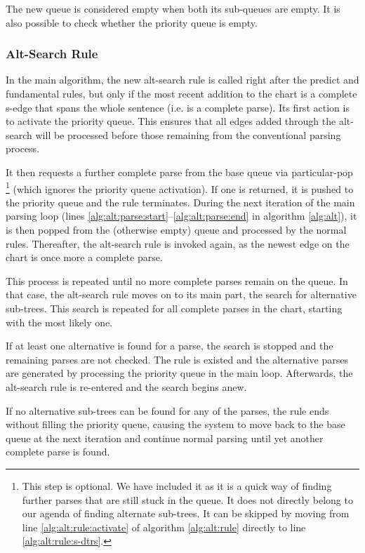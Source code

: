 \documentclass[11pt, titlepage, a4paper]{scrartcl}		%
\newcommand{\xmas}[1]{alt-search#1}
\newcommand{\XMas}[1]{Alt-Search#1}
\begin{document}
The new queue is considered empty when both its sub-queues are empty. It is also possible to check whether the priority queue is empty.

\subsubsection{\XMas{} Rule}
In the main algorithm, the new \xmas{} rule is called right after the predict and fundamental rules, but only if the most recent addition to the chart is a complete s-edge that spans the whole sentence (i.e. is a complete parse).
Its first action is to activate the priority queue. This ensures that all edges added through the \xmas{} will be processed before those remaining from the conventional parsing process.

It then requests a further complete parse from the base queue via particular-pop%
\footnote{This step is optional. We have included it as it is a quick way of finding further parses that are still stuck in the queue. It does not directly belong to our agenda of finding alternate sub-trees. It can be skipped by moving from line \ref{alg:alt:rule:activate}  of algorithm \ref{alg:alt:rule} directly to line \ref{alg:alt:rule:s-dtrs}.\label{foot:optional}}
(which ignores the priority queue activation).
If one is returned, it is pushed to the priority queue and the rule terminates.
During the next iteration of the main parsing loop (lines \ref{alg:alt:parse:start}--\ref{alg:alt:parse:end} in algorithm \ref{alg:alt}), it is then popped from the (otherwise empty) queue and processed by the normal rules. Thereafter, the \xmas{} rule is invoked again, as the newest edge on the chart is once more a complete parse.

This process is repeated until no more complete parses remain on the queue.
In that case, the \xmas{} rule moves on to its main part, the search for alternative sub-trees.
This search is repeated for all complete parses in the chart, starting with the most likely one.

If at least one alternative is found for a parse, the search is stopped and the remaining parses are not checked.
The rule is existed and the alternative parses are generated by processing the priority queue in the main loop.
Afterwards, the \xmas{} rule is re-entered and the search begins anew.

If no alternative sub-trees can be found for any of the parses, the rule ends without filling the priority queue, causing the system to move back to the base queue at the next iteration and continue normal parsing until yet another complete parse is found.
\end{document}
